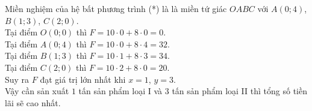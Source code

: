 \begin{bt}
{\begin{center}
\end{center}
	Miền nghiệm của hệ bất phương trình (*) là là miền tứ giác $OABC$ với $A(0;4)$, $B(1;3)$, $C(2;0)$.\\
	Tại điểm $O(0;0)$ thì $F=10\cdot0+8\cdot0=0$.\\
	Tại điểm $A(0;4)$ thì $F=10\cdot0+8\cdot4=32$.\\
	Tại điểm $B(1;3)$ thì $F=10\cdot1+8\cdot3=34$.\\
	Tại điểm $C(2;0)$ thì $F=10\cdot2+8\cdot0=20$.\\
	Suy ra $F$ đạt giá trị lớn nhất khi $x=1$, $y=3$.\\
	Vậy cần sản xuất $1$ tấn sản phẩm loại I và $3$ tấn sản phẩm loại II thì tổng số tiền lãi sẽ cao nhất.
}
\end{bt}


